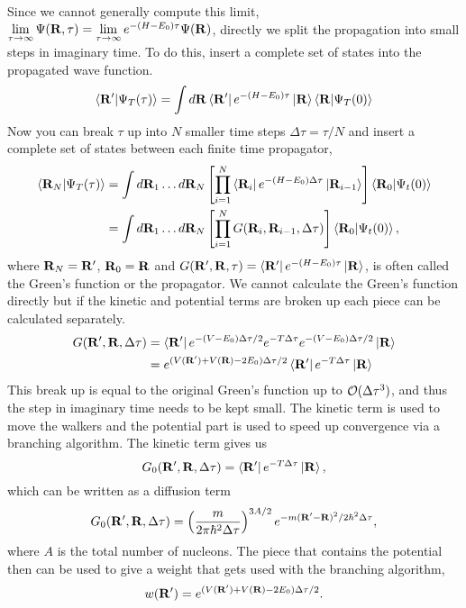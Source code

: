 Since we cannot generally compute this limit, $\lim\limits_{\tau\rightarrow\infty}\Psi(\mathbf{R},\tau) = \lim\limits_{\tau\rightarrow\infty}e^{-(H-E_0)\tau}\Psi(\mathbf{R})$, directly we split the propagation into small steps in imaginary time. To do this, insert a complete set of states into the propagated wave function.
\begin{equation}
   \left< \mathbf{R}' | \Psi_T(\tau) \right> = \int d\mathbf{R} \left< \mathbf{R}' \right|e^{-(H-E_0)\tau}\left| \mathbf{R} \right>\left< \mathbf{R} | \Psi_T(0) \right>
\end{equation}
Now you can break $\tau$ up into $N$ smaller time steps $\Delta \tau = \tau/N$ and insert a complete set of states between each finite time propagator,
\begin{align}
   \left< \mathbf{R}_N | \Psi_T(\tau) \right> &= \int d\mathbf{R}_1 \ldots d\mathbf{R}_N \left[\prod\limits_{i=1}^N \left< \mathbf{R}_i \right|e^{-(H-E_0)\Delta\tau}\left| \mathbf{R}_{i-1} \right>\right] \left< \mathbf{R}_0 | \Psi_t(0) \right> \\
   &= \int d\mathbf{R}_1 \ldots d\mathbf{R}_N \left[\prod\limits_{i=1}^N G(\mathbf{R}_i,\mathbf{R}_{i-1},\Delta\tau)\right] \left< \mathbf{R}_0 | \Psi_t(0) \right>,
\end{align}
where $\mathbf{R}_N=\mathbf{R}'$, $\mathbf{R}_0=\mathbf{R}$ and $G(\mathbf{R}',\mathbf{R},\tau)=\left< \mathbf{R}' \right|e^{-(H-E_0)\tau}\left| \mathbf{R} \right>$, is often called the Green's function or the propagator. We cannot calculate the Green's function directly but if the kinetic and potential terms are broken up each piece can be calculated separately.
\begin{align}
   G(\mathbf{R}',\mathbf{R},\Delta\tau) &= \left< \mathbf{R}' \right|e^{-(V-E_0)\Delta\tau/2}e^{-T\Delta\tau}e^{-(V-E_0)\Delta\tau/2}\left| \mathbf{R} \right> \\
   &= e^{(V(\mathbf{R}')+V(\mathbf{R})-2E_0)\Delta\tau/2}\left< \mathbf{R}' \right|e^{-T\Delta\tau}\left| \mathbf{R} \right>
\end{align}
This break up is equal to the original Green's function up to $\mathcal{O}(\Delta\tau^3)$, and thus the step in imaginary time needs to be kept small. The kinetic term is used to move the walkers and the potential part is used to speed up convergence via a branching algorithm. The kinetic term gives us
\begin{equation}
   G_0(\mathbf{R}',\mathbf{R},\Delta \tau) = \left< \mathbf{R}' \right|e^{-T\Delta \tau}\left| \mathbf{R} \right>,
\end{equation}
which can be written as a diffusion term
\begin{equation}
   G_0(\mathbf{R}',\mathbf{R},\Delta \tau) = \left(\frac{m}{2\pi\hbar^2\Delta\tau}\right)^{3A/2}e^{-m(\mathbf{R}'-\mathbf{R})^2/2\hbar^2\Delta\tau},
\end{equation}
where $A$ is the total number of nucleons.
The piece that contains the potential then can be used to give a weight that gets used with the branching algorithm,
\begin{equation}
   w(\mathbf{R}') = e^{(V(\mathbf{R}')+V(\mathbf{R})-2E_0)\Delta\tau/2}.
\end{equation}

